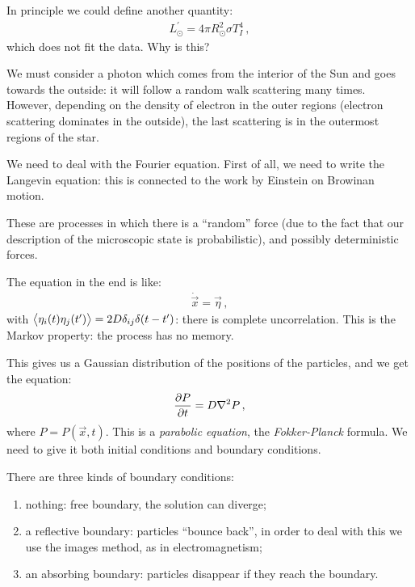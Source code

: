 \documentclass[main.tex]{subfiles}
\begin{document}
In principle we could define another quantity: 
%
\begin{align}
  L_{\odot}^{\prime } = 4 \pi R_{\odot}^2 \sigma T_I^4
\,,
\end{align}
%
which does not fit the data. Why is this? 

We must consider a photon which comes from the interior of the Sun and goes towards the outside: it will follow a random walk scattering many times. However, depending on the density of electron in the outer regions (electron scattering dominates in the outside), the last scattering is in the outermost regions of the star. 

We need to deal with the Fourier equation. 
First of all, we need to write the Langevin equation: this is connected to the work by Einstein on Browinan motion. 

These are processes in which there is a ``random'' force (due to the fact that our description of the microscopic state is probabilistic), and possibly deterministic forces. 


The equation in the end is like: 
%
\begin{align}
  \dot{\vec{x}} = \vec{\eta}
\,,
\end{align}
%
with \(\expval{\eta _i (t) \eta_j (t')} = 2 D \delta_{ij} \delta (t - t')\): there is complete uncorrelation. This is the Markov property: the process has no memory.

This gives us a Gaussian distribution of the positions of the particles, and we get the equation: 
%
\begin{align}
  \pdv{P}{t} = D \nabla^2 P 
\,,
\end{align}
%
where \(P = P( \vec{x}, t)\). This is a \emph{parabolic equation}, the \emph{Fokker-Planck} formula. 
We need to give it both initial conditions and boundary conditions. 


There are three kinds of boundary conditions: 
\begin{enumerate}
  \item nothing: free boundary, the solution can diverge;
  \item a reflective boundary: particles ``bounce back'', in order to deal with this we use the images method, as in electromagnetism;
  \item an absorbing boundary: particles disappear if they reach the boundary. 
\end{enumerate}
\end{document}
